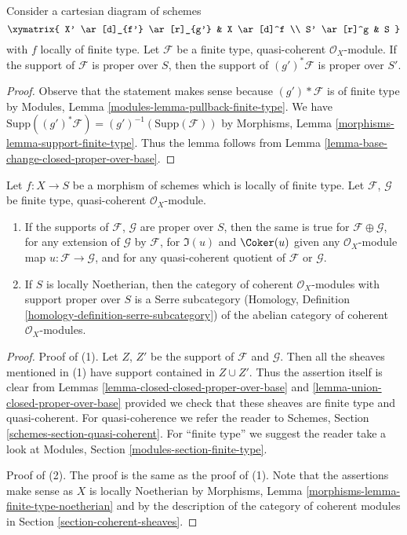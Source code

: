 \begin{lemma}
\label{lemma-base-change-module-support-proper-over-base}
Consider a cartesian diagram of schemes
$$
\xymatrix{
X' \ar[d]_{f'} \ar[r]_{g'} & X \ar[d]^f \\
S' \ar[r]^g & S
}
$$
with $f$ locally of finite type. Let $\mathcal{F}$ be a
finite type, quasi-coherent $\mathcal{O}_X$-module.
If the support of $\mathcal{F}$ is proper over $S$, then
the support of $(g')^*\mathcal{F}$ is proper over $S'$.
\end{lemma}

\begin{proof}
Observe that the statement makes sense because
$(g')*\mathcal{F}$ is of finite type by
Modules, Lemma \ref{modules-lemma-pullback-finite-type}.
We have $\text{Supp}((g')^*\mathcal{F}) = (g')^{-1}(\text{Supp}(\mathcal{F}))$
by Morphisms, Lemma \ref{morphisms-lemma-support-finite-type}.
Thus the lemma follows from
Lemma \ref{lemma-base-change-closed-proper-over-base}.
\end{proof}

\begin{lemma}
\label{lemma-cat-module-support-proper-over-base}
Let $f : X \to S$ be a morphism of schemes which is locally
of finite type. Let $\mathcal{F}$, $\mathcal{G}$
be finite type, quasi-coherent $\mathcal{O}_X$-module.
\begin{enumerate}
\item If the supports of $\mathcal{F}$, $\mathcal{G}$
are proper over $S$, then the same is true
for $\mathcal{F} \oplus \mathcal{G}$, for any extension
of $\mathcal{G}$ by $\mathcal{F}$, for $\Im(u)$ and $\Coker(u)$
given any $\mathcal{O}_X$-module map $u : \mathcal{F} \to \mathcal{G}$,
and for any quasi-coherent quotient of $\mathcal{F}$ or $\mathcal{G}$.
\item If $S$ is locally Noetherian, then the category of
coherent $\mathcal{O}_X$-modules with support proper over
$S$ is a Serre subcategory (Homology, Definition
\ref{homology-definition-serre-subcategory})
of the abelian category of
coherent $\mathcal{O}_X$-modules.
\end{enumerate}
\end{lemma}

\begin{proof}
Proof of (1). Let $Z$, $Z'$ be the support of $\mathcal{F}$
and $\mathcal{G}$. Then all the sheaves mentioned in (1)
have support contained in $Z \cup Z'$. Thus the assertion itself
is clear from Lemmas \ref{lemma-closed-closed-proper-over-base} and
\ref{lemma-union-closed-proper-over-base}
provided we check that these sheaves are finite type
and quasi-coherent. For quasi-coherence we refer the reader to
Schemes, Section \ref{schemes-section-quasi-coherent}.
For ``finite type'' we suggest the reader take a look at
Modules, Section \ref{modules-section-finite-type}.

\medskip\noindent
Proof of (2). The proof is the same as the proof of (1). Note that
the assertions make sense as $X$ is locally Noetherian by
Morphisms, Lemma \ref{morphisms-lemma-finite-type-noetherian}
and by the description of the category of coherent
modules in Section \ref{section-coherent-sheaves}.
\end{proof}

